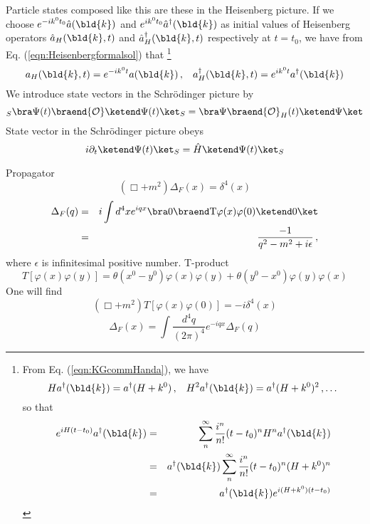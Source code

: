 Particle states composed like this are these in the Heisenberg picture.
If we choose $e^{-i k^0 t_0} \hat{a}(\bld{k})$ and $e^{i k^0 t_0} \hat{a}^\dagger(\bld{k})$
as initial values of Heisenberg operators $\hat{a}_H(\bld{k}, t)$ and $\hat{a}_H^\dagger(\bld{k}, t)$
respectively at $t = t_0$, we have from Eq. (\ref{eqn:Heisenbergformalsol}) that
\footnote{
From Eq. (\ref{eqn:KGcommHanda}), we have
\begin{equation*}
H a^\dagger (\bld{k}) = a^\dagger (H + k^0)
\,,\hspace{3mm}
H^2 a^\dagger (\bld{k}) = a^\dagger (H + k^0)^2\,,\dots
\end{equation*}
so that
\begin{eqnarray*}
e^{i H (t-t_0)} a^\dagger (\bld{k})
&=&
\sum_n^\infty \frac{i^n}{n!} (t-t_0)^n H^n a^\dagger (\bld{k})
\\
&=&
a^\dagger (\bld{k}) \sum_n^\infty \frac{i^n}{n!} (t-t_0)^n (H + k^0)^n 
\\
&=&
a^\dagger (\bld{k})  e^{i (H + k^0) (t-t_0)}
\end{eqnarray*}
} %
\begin{equation}
a_H(\bld{k}, t) = e^{-i k^0 t} a (\bld{k})\,,
\hspace{3mm}
a_H^\dagger(\bld{k}, t) = e^{i k^0 t} a^\dagger (\bld{k})
\end{equation}
We introduce state vectors in the Schr\"odinger picture by
\begin{equation}
{}_S\bra \Psi(t) \braend {\cal O} \ketend \Psi(t) \ket_S
=
\bra \Psi \braend {\cal O}_H(t) \ketend \Psi \ket
\end{equation}
State vector in the Schr\"odinger picture obeys 
\begin{equation}
i \partial_t \ketend \Psi(t) \ket_S = \hat{H} \ketend \Psi(t) \ket_S
\end{equation}

\bigskip

\noindent
Propagator
\begin{equation}
\left( \Box + m^2 \right) \Delta_F(x) = \delta^4(x) 
\end{equation}
\begin{eqnarray}
\Delta_F(q) 
&=&
i \int d^4x e^{iqx} 
\bra 0 \braend \mbox{T}\varphi(x) \varphi(0) 
\ketend 0 \ket
\nonumber\\
&=&
\frac{-1}{q^2 - m^2 + i\epsilon}\,,
\end{eqnarray}
where $\epsilon$ is infinitesimal positive number.
T-product
\begin{equation}
T[\varphi(x) \varphi(y)] =
\theta(x^0 - y^0)\varphi(x) \varphi(y)
+
\theta(y^0 - x^0)\varphi(y) \varphi(x)
\end{equation}
One will find
\[
\left( \Box + m^2 \right) T[\varphi(x) \varphi(0)] = -i \delta^4(x)
\]
\begin{equation}
\Delta_F(x) = \int \frac{d^4 q}{(2\pi)^4} e^{-iqx} \Delta_F(q)
\end{equation}